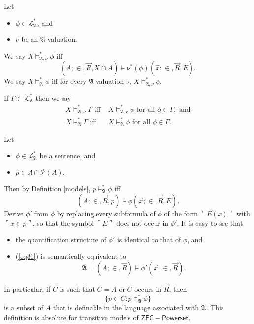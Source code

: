 \documentclass[12pt]{article}
\numberwithin{equation}{section}
\begin{document}
\begin{defi}\label{models}
Let 
\begin{itemize}
    \item $\phi \in \mathcal{L}^{*}_{\mathfrak{A}}$, and
    \item $\nu$ be an $\mathfrak{A}$-valuation.
\end{itemize} 
We say $X \models^*_{\mathfrak{A}, \nu} \phi$ iff $$(A; \in, \Vec{R}, X \cap A) \models \nu^*(\phi)(\Vec{x}; \in, \Vec{R}, E).$$ 
We say $X \models^*_{\mathfrak{A}} \phi$ iff for every $\mathfrak{A}$-valuation $\nu$, $X \models^*_{\mathfrak{A}, \nu} \phi$.

If $\Gamma \subset \mathcal{L}^*_{\mathfrak{A}}$ then we say
\begin{align*}
    X \models^*_{\mathfrak{A}, \nu} \Gamma \text{ iff } & X \models^*_{\mathfrak{A}, \nu} \phi \text{ for all } \phi \in \Gamma, \text{ and} \\ 
    X \models^*_{\mathfrak{A}} \Gamma \text{ iff } & X \models^*_{\mathfrak{A}} \phi \text{ for all } \phi \in \Gamma.
\end{align*}
\end{defi}

\begin{rem}\label{def2}
Let
\begin{itemize}
    \item $\phi \in \mathcal{L}^{*}_{\mathfrak{A}}$ be a sentence, and
    \item $p \in A \cap \mathcal{P}(A)$.
\end{itemize}
Then by Definition \ref{models}, $p \models^*_{\mathfrak{A}} \phi$ iff 
\begin{equation}\label{eq31}
    (A; \in, \Vec{R}, p) \models \phi(\Vec{x}; \in, \Vec{R}, E).
\end{equation}
Derive $\phi'$ from $\phi$ by replacing every subformula of $\phi$ of the form $\ulcorner E(x) \urcorner$ with $\ulcorner x \in p \urcorner$, so that the symbol $\ulcorner E \urcorner$ does not occur in $\phi'$. It is easy to see that 
\begin{itemize}
    \item the quantification structure of $\phi'$ is identical to that of $\phi$, and
    \item (\ref{eq31}) is semantically equivalent to $$\mathfrak{A} = (A; \in, \Vec{R}) \models \phi'(\Vec{x}; \in, \Vec{R}).$$ 
\end{itemize}
In particular, if $C$ is such that $C = A$ or $C$ occurs in $\Vec{R}$, then $$\{p \in C : p \models^*_{\mathfrak{A}} \phi\}$$ is a subset of $A$ that is definable in the language associated with $\mathfrak{A}$. This definition is absolute for transitive models of $\mathsf{ZFC - Powerset}$.
\end{rem}
\end{document}
